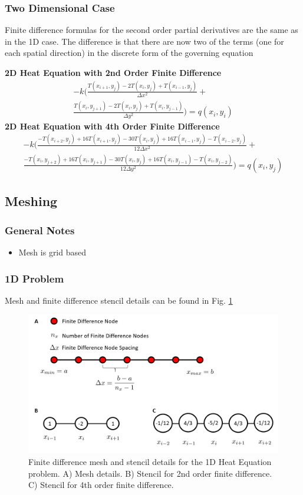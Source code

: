 \documentclass[letterpaper,12pt]{article}
\begin{document}
\subsubsection{Two Dimensional Case}
Finite difference formulas for the second order partial derivatives are the same as in the 1D case. The difference is that there are now two of the terms (one for each spatial direction) in the discrete form of the governing equation

\textbf{2D Heat Equation with 2nd Order Finite Difference}
\begin{multline}
\label{heat2d2FD}
-k \Big( \frac{T(x_{i+1}, y_j) - 2  T(x_i, y_j) + T(x_{i-1}, y_j)}{\Delta x^2} + \\ \frac{T(x_i,y_{j+1}) - 2  T(x_i, y_j) + T(x_i, y_{j-1})}{\Delta y^2} \Big)= q(x_i, y_i)
\end{multline}
\textbf{2D Heat Equation with 4th Order Finite Difference}
\begin{multline}
\label{heat2d4FD}
-k \Big(\frac{-T(x_{i+2}, y_j) + 16  T(x_{i+1}, y_j) - 30T(x_i, y_j) + 16 T(x_{i-1}, y_j) -T(x_{i-2}, y_j)}{12 \Delta x^2} + \\ \frac{-T(x_i, y_{j+2}) + 16  T(x_i, y_{j+1}) - 30T(x_i, y_j) + 16 T(x_i, y_{j-1}) -T(x_i, y_{j-2})}{12 \Delta y^2} \Big) = q(x_i, y_j)
\end{multline}
\subsection{Meshing}
\subsubsection{General Notes}
\begin{itemize}
\item Mesh is grid based
\end{itemize}
\subsubsection{1D Problem}
Mesh and finite difference stencil details can be found in Fig. \ref{1DMesh}

\begin{figure}[h]
\centering
\includegraphics[width=1 \textwidth]{1D_Mesh.PNG}
\caption{Finite difference mesh and stencil details for the 1D Heat Equation problem. A) Mesh details. B) Stencil for 2nd order finite difference. C) Stencil for 4th order finite difference.}
\label{1DMesh}
\end{figure}
\end{document}
